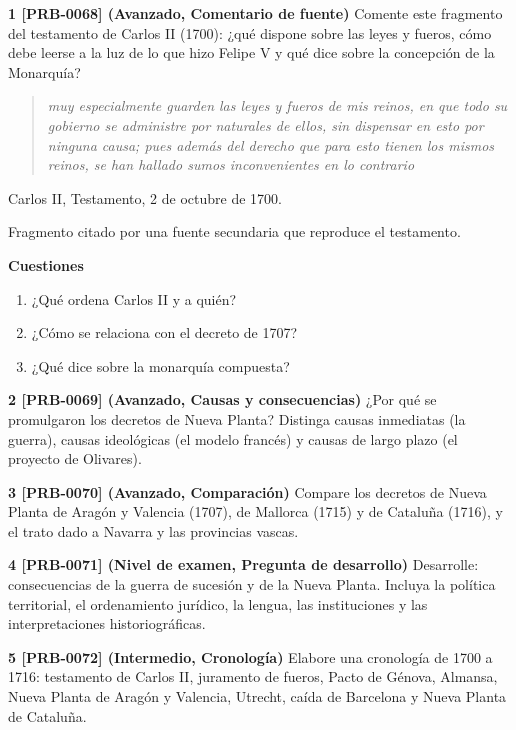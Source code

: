 \documentclass{book}
\begin{document}
\begin{tcolorbox}[title={Ejercicios}, studiumworked, breakable]

\noindent\textbf{1 [PRB-0068] (Avanzado, Comentario de fuente)}
Comente este fragmento del testamento de Carlos II (1700): ¿qué dispone sobre las leyes y fueros, cómo debe leerse a la luz de lo que hizo Felipe V y qué dice sobre la concepción de la Monarquía?


\begin{quote}
\itshape muy especialmente guarden las leyes y fueros de mis reinos, en que todo su gobierno se administre por naturales de ellos, sin dispensar en esto por ninguna causa; pues además del derecho que para esto tienen los mismos reinos, se han hallado sumos inconvenientes en lo contrario
\end{quote}
{\noindent\footnotesize Carlos II, Testamento, 2 de octubre de 1700.\par}
{\noindent\footnotesize Fragmento citado por una fuente secundaria que reproduce el testamento.\par}

\noindent\textbf{Cuestiones}
\begin{enumerate}
\item ¿Qué ordena Carlos II y a quién?
\item ¿Cómo se relaciona con el decreto de 1707?
\item ¿Qué dice sobre la monarquía compuesta?
\end{enumerate}

\noindent\textbf{2 [PRB-0069] (Avanzado, Causas y consecuencias)}
¿Por qué se promulgaron los decretos de Nueva Planta? Distinga causas inmediatas (la guerra), causas ideológicas (el modelo francés) y causas de largo plazo (el proyecto de Olivares).


\noindent\textbf{3 [PRB-0070] (Avanzado, Comparación)}
Compare los decretos de Nueva Planta de Aragón y Valencia (1707), de Mallorca (1715) y de Cataluña (1716), y el trato dado a Navarra y las provincias vascas.


\noindent\textbf{4 [PRB-0071] (Nivel de examen, Pregunta de desarrollo)}
Desarrolle: consecuencias de la guerra de sucesión y de la Nueva Planta. Incluya la política territorial, el ordenamiento jurídico, la lengua, las instituciones y las interpretaciones historiográficas.


\noindent\textbf{5 [PRB-0072] (Intermedio, Cronología)}
Elabore una cronología de 1700 a 1716: testamento de Carlos II, juramento de fueros, Pacto de Génova, Almansa, Nueva Planta de Aragón y Valencia, Utrecht, caída de Barcelona y Nueva Planta de Cataluña.

\end{tcolorbox}
\end{document}
